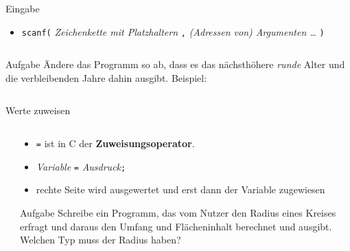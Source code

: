 \documentclass[
  aspectratio=1610,
]{beamer}
\begin{document}
\begin{frame}{Eingabe}
  \begin{itemize}
    \item \texttt{scanf(} %
      \textit{Zeichenkette mit Platzhaltern}
      \texttt{,}
      \textit{(Adressen von) Argumenten \ldots}
      \texttt{)} %

      \pause{}

      \inputminted{c}{eingabe.c}
  \end{itemize}

  \pause

  \begin{block}{Aufgabe}
    Ändere das Programm so ab, dass es das nächsthöhere \emph{runde} Alter und die
    verbleibenden Jahre dahin ausgibt. Beispiel:

    \inputminted{text}{eingabe_beispiel.txt}
  \end{block}

\end{frame}

\begin{frame}{Werte zuweisen}
  \begin{columns}[T]
    \begin{column}{0.40\textwidth}
      \inputminted{c}{zuweisung.c}
    \end{column}
    \begin{column}{0.60\textwidth}
      \begin{itemize}
        \item \texttt{=} ist in C der \textbf{Zuweisungsoperator}.
        \item \textit{Variable} \texttt{=} \textit{Ausdruck}\texttt{;}
        \item rechte Seite wird ausgewertet und erst dann der Variable zugewiesen
      \end{itemize}

      \pause

      \begin{block}{Aufgabe}
        Schreibe ein Programm, das vom Nutzer den Radius eines Kreises erfragt und daraus
        den Umfang und Flächeninhalt berechnet und ausgibt. Welchen Typ muss der Radius
        haben?
      \end{block}
    \end{column}
  \end{columns}
\end{frame}
\end{document}
